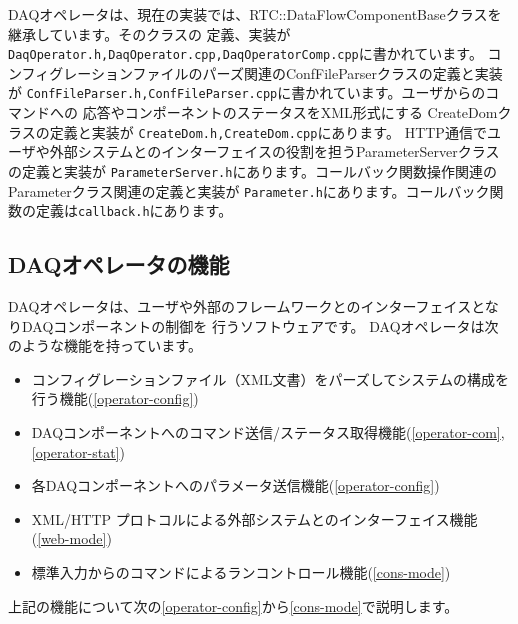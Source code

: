 \documentclass[a4j,10pt,dvips,onecolumn,oneside,final]{jarticle}%
\begin{document}
DAQオペレータは、現在の実装では、RTC::DataFlowComponentBaseクラスを継承しています。そのクラスの
定義、実装が\verb|DaqOperator.h,DaqOperator.cpp,DaqOperatorComp.cpp|に書かれています。
コンフィグレーションファイルのパーズ関連のConfFileParserクラスの定義と実装が
\verb|ConfFileParser.h,ConfFileParser.cpp|に書かれています。ユーザからのコマンドへの
応答やコンポーネントのステータスをXML形式にする CreateDomクラスの定義と実装が
\verb|CreateDom.h,CreateDom.cpp|にあります。
HTTP通信でユーザや外部システムとのインターフェイスの役割を担うParameterServerクラスの定義と実装が
\verb|ParameterServer.h|にあります。コールバック関数操作関連のParameterクラス関連の定義と実装が
\verb|Parameter.h|にあります。コールバック関数の定義は\verb|callback.h|にあります。

\subsection{DAQオペレータの機能}
DAQオペレータは、ユーザや外部のフレームワークとのインターフェイスとなりDAQコンポーネントの制御を
行うソフトウェアです。
DAQオペレータは次のような機能を持っています。
\begin{itemize}
\item コンフィグレーションファイル（XML文書）をパーズしてシステムの構成を行う機能(\ref{operator-config})
\item DAQコンポーネントへのコマンド送信/ステータス取得機能(\ref{operator-com},\ref{operator-stat})
\item 各DAQコンポーネントへのパラメータ送信機能(\ref{operator-config})
\item XML/HTTP プロトコルによる外部システムとのインターフェイス機能(\ref{web-mode})
\item 標準入力からのコマンドによるランコントロール機能(\ref{cons-mode})
\end{itemize}

上記の機能について次の\ref{operator-config}から\ref{cons-mode}で説明します。
\end{document}
